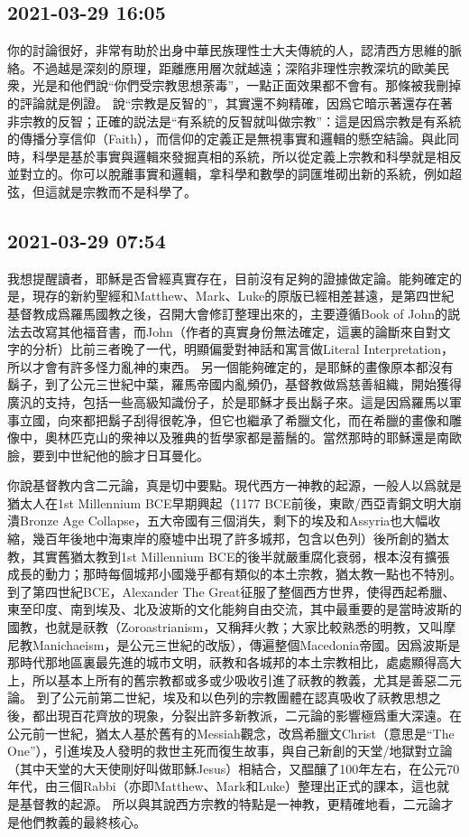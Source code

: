 \documentclass[twocolumn]{ctexart}
\begin{document}
\subsection*{2021-03-29 16:05}

你的討論很好，非常有助於出身中華民族理性士大夫傳統的人，認清西方思維的脈絡。不過越是深刻的原理，距離應用層次就越遠；深陷非理性宗教深坑的歐美民衆，光是和他們說“你們受宗教思想荼毒”，一點正面效果都不會有。那條被我刪掉的評論就是例證。
說“宗教是反智的”，其實還不夠精確，因爲它暗示著還存在著非宗教的反智；正確的説法是“有系統的反智就叫做宗教”：這是因爲宗教是有系統的傳播分享信仰（Faith），而信仰的定義正是無視事實和邏輯的懸空結論。與此同時，科學是基於事實與邏輯來發掘真相的系統，所以從定義上宗教和科學就是相反並對立的。你可以脫離事實和邏輯，拿科學和數學的詞匯堆砌出新的系統，例如超弦，但這就是宗教而不是科學了。
\subsection*{2021-03-29 07:54}

我想提醒讀者，耶穌是否曾經真實存在，目前沒有足夠的證據做定論。能夠確定的是，現存的新約聖經和Matthew、Mark、Luke的原版已經相差甚遠，是第四世紀基督教成爲羅馬國教之後，召開大會修訂整理出來的，主要遵循Book of John的説法去改寫其他福音書，而John（作者的真實身份無法確定，這裏的論斷來自對文字的分析）比前三者晚了一代，明顯偏愛對神話和寓言做Literal Interpretation，所以才會有許多怪力亂神的東西。
另一個能夠確定的，是耶穌的畫像原本都沒有鬍子，到了公元三世紀中葉，羅馬帝國内亂頻仍，基督教做爲慈善組織，開始獲得廣汎的支持，包括一些高級知識份子，於是耶穌才長出鬍子來。這是因爲羅馬以軍事立國，向來都把鬍子刮得很乾净，但它也繼承了希臘文化，而在希臘的畫像和雕像中，奧林匹克山的衆神以及雅典的哲學家都是蓄鬚的。當然那時的耶穌還是南歐臉，要到中世紀他的臉才日耳曼化。

你說基督教内含二元論，真是切中要點。現代西方一神教的起源，一般人以爲就是猶太人在1st Millennium BCE早期興起（1177 BCE前後，東歐/西亞青銅文明大崩潰Bronze Age Collapse，五大帝國有三個消失，剩下的埃及和Assyria也大幅收縮，幾百年後地中海東岸的廢墟中出現了許多城邦，包含以色列）後所創的猶太教，其實舊猶太教到1st Millennium BCE的後半就嚴重腐化衰弱，根本沒有擴張成長的動力；那時每個城邦小國幾乎都有類似的本土宗教，猶太教一點也不特別。
到了第四世紀BCE，Alexander The Great征服了整個西方世界，使得西起希臘、東至印度、南到埃及、北及波斯的文化能夠自由交流，其中最重要的是當時波斯的國教，也就是祆教（Zoroastrianism，又稱拜火教；大家比較熟悉的明教，又叫摩尼教Manichaeism，是公元三世紀的改版），傳遍整個Macedonia帝國。因爲波斯是那時代那地區裏最先進的城市文明，祆教和各城邦的本土宗教相比，處處顯得高大上，所以基本上所有的舊宗教都或多或少吸收引進了祆教的教義，尤其是善惡二元論。
到了公元前第二世紀，埃及和以色列的宗教團體在認真吸收了祆教思想之後，都出現百花齊放的現象，分裂出許多新教派，二元論的影響極爲重大深遠。在公元前一世紀，猶太人基於舊有的Messiah觀念，改爲希臘文Christ（意思是“The One”），引進埃及人發明的救世主死而復生故事，與自己新創的天堂/地獄對立論（其中天堂的大天使剛好叫做耶穌Jesus）相結合，又醖釀了100年左右，在公元70年代，由三個Rabbi（亦即Matthew、Mark和Luke）整理出正式的課本，這也就是基督教的起源。
所以與其說西方宗教的特點是一神教，更精確地看，二元論才是他們教義的最終核心。
\end{document}
